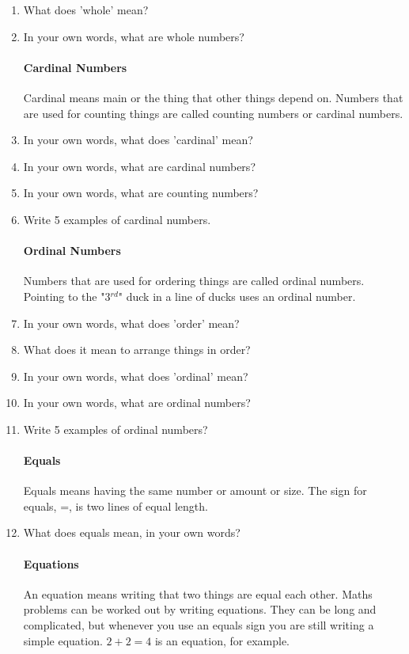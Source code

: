 \documentclass[12pt]{article}
\begin{document}
\begin{enumerate}
\item What does 'whole' mean?
\item In your own words, what are whole numbers?

\paragraph{Cardinal Numbers}
Cardinal means main or the thing that other things depend on. Numbers that are used for counting things are called counting numbers or cardinal numbers.

\item In your own words, what does 'cardinal' mean?
\item In your own words, what are cardinal numbers?
\item In your own words, what are counting numbers?
\item Write 5 examples of cardinal numbers.

\paragraph{Ordinal Numbers}
Numbers that are used for ordering things are called ordinal numbers. Pointing to the "$3{^{rd}}$" duck in a line of ducks uses an ordinal number.

\item In your own words, what does 'order' mean?
\item What does it mean to arrange things in order?
\item In your own words, what does 'ordinal' mean?
\item In your own words, what are ordinal numbers?
\item Write 5 examples of ordinal numbers?

\paragraph{Equals}
Equals means having the same number or amount or size.
The sign for equals, =, is two lines of equal length.

\item What does equals mean, in your own words?

\paragraph{Equations}
An equation means writing that two things are equal each other. Maths problems can be worked out by writing equations. They can be long and complicated, but whenever you use an equals sign you are still writing a simple equation. $2+2=4$ is an equation, for example.


\end{enumerate}
\end{document}
